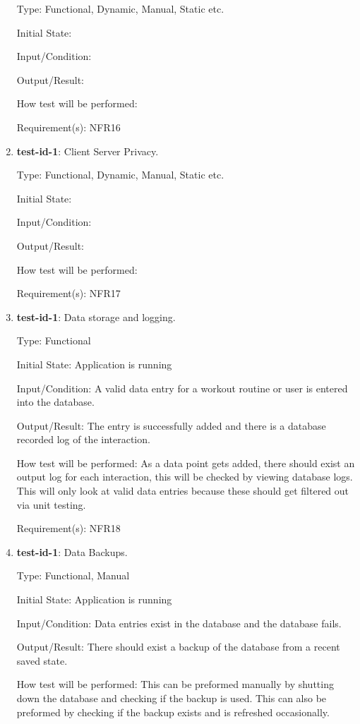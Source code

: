 \documentclass[12pt, titlepage]{article}
\begin{document}
\begin{enumerate}
		Type: Functional, Dynamic, Manual, Static etc.
		
		Initial State: 
		
		Input/Condition: 
		
		Output/Result: 
		
		How test will be performed: 
		
		Requirement(s): NFR16
		
		\item{\textbf{test-id-1}}: Client Server Privacy.
		
		Type: Functional, Dynamic, Manual, Static etc.
		
		Initial State: 
		
		Input/Condition: 
		
		Output/Result: 
		
		How test will be performed: 
		
		Requirement(s): NFR17
		
		\item{\textbf{test-id-1}}: Data storage and logging.
		
		Type: Functional
		
		Initial State: Application is running 
		
		Input/Condition: A valid data entry for a workout routine or user is entered into the database.
		
		Output/Result: The entry is successfully added and there is a database recorded log of the interaction.
		
		How test will be performed: As a data point gets added, there should exist an output log for each interaction, this will be checked by viewing database logs. This will only look at valid data entries because these should get filtered out via unit testing.
		
		Requirement(s): NFR18
		
		\item{\textbf{test-id-1}}: Data Backups.
		
		Type: Functional, Manual
		
		Initial State: Application is running
		
		Input/Condition: Data entries exist in the database and the database fails.
		
		Output/Result: There should exist a backup of the database from a recent saved state.
		
		How test will be performed: This can be preformed manually by shutting down the database and checking if the backup is used. This can also be preformed by checking if the backup exists and is refreshed occasionally.
		

\end{enumerate}
\end{document}
